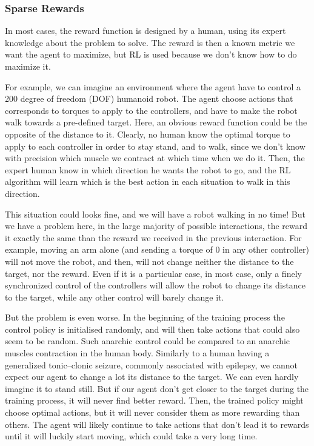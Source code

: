 \subsubsection{Sparse Rewards}\label{subsubsection:bg:rl:prblems:sparse-rewards}

In most cases, the reward function is designed by a human, using its expert knowledge about the problem to solve.
The reward is then a known metric we want the agent to maximize, but RL is used because we don't know how to do maximize
it.

For example, we can imagine an environment where the agent have to control a 200 degree of freedom (DOF) humanoid robot.
The agent choose actions that corresponds to torques to apply to the controllers, and have to make the robot walk
towards a pre-defined target.
Here, an obvious reward function could be the opposite of the distance to it.
Clearly, no human know the optimal torque to apply to each controller in order to stay stand, and to walk, since we
don't know with precision which muscle we contract at which time when we do it.
Then, the expert human know in which direction he wants the robot to go, and the RL algorithm will learn which is the
best action in each situation to walk in this direction.

This situation could looks fine, and we will have a robot walking in no time!
But we have a problem here, in the large majority of possible interactions, the reward it exactly the same than the
reward we received in the previous interaction.
For example, moving an arm alone (and sending a torque of 0 in any other controller) will not move the robot, and then,
will not change neither the distance to the target, nor the reward.
Even if it is a particular case, in most case, only a finely synchronized control of the controllers will allow the
robot to change its distance to the target, while any other control will barely change it.

But the problem is even worse.
In the beginning of the training process the control policy is initialised randomly, and will then take actions that
could also seem to be random.
Such anarchic control could be compared to an anarchic muscles contraction in the human body.
Similarly to a human having a generalized tonic–clonic seizure, commonly associated with epilepsy, we cannot expect our
agent to change a lot its distance to the target.
We can even hardly imagine it to stand still.
But if our agent don't get closer to the target during the training process, it will never find better reward.
Then, the trained policy might choose optimal actions, but it will never consider them as more rewarding than others.
The agent will likely continue to take actions that don't lead it to rewards until it will luckily start moving, which
could take a very long time.


